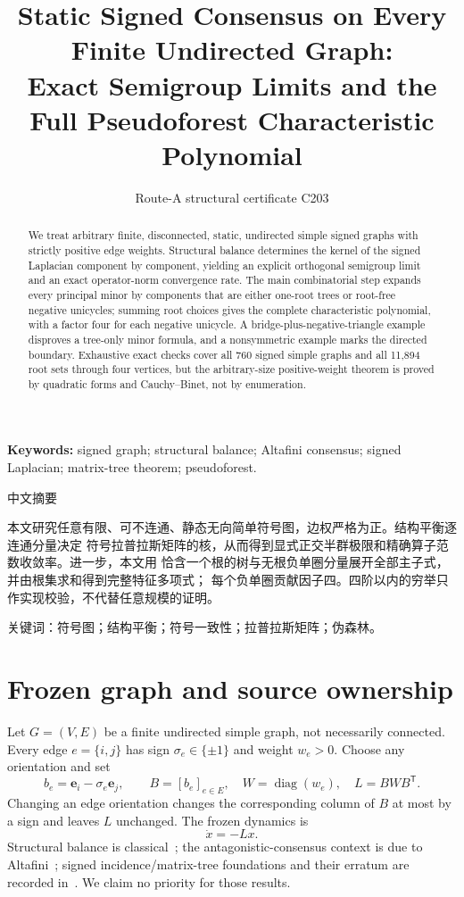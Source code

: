 \documentclass[9pt]{extarticle}
\title{Static Signed Consensus on Every Finite Undirected Graph:\\
Exact Semigroup Limits and the Full Pseudoforest Characteristic Polynomial}
\author{Route-A structural certificate C203}
\date{}
\begin{document}
\maketitle

\begin{abstract}
We treat arbitrary finite, disconnected, static, undirected simple signed
graphs with strictly positive edge weights.  Structural balance determines the
kernel of the signed Laplacian component by component, yielding an explicit
orthogonal semigroup limit and an exact operator-norm convergence rate.  The
main combinatorial step expands every principal minor by components that are
either one-root trees or root-free negative unicycles; summing root choices
gives the complete characteristic polynomial, with a factor four for each
negative unicycle.  A bridge-plus-negative-triangle example disproves a
tree-only minor formula, and a nonsymmetric example marks the directed
boundary.  Exhaustive exact checks cover all 760 signed simple graphs and all
11,894 root sets through four vertices, but the arbitrary-size positive-weight
theorem is proved by quadratic forms and Cauchy--Binet, not by enumeration.
\end{abstract}
\noindent\textbf{Keywords:} signed graph; structural balance; Altafini
consensus; signed Laplacian; matrix-tree theorem; pseudoforest.

\begin{otherlanguage}{chinese-simplified}
\begin{center}{\large 中文摘要}\end{center}
本文研究任意有限、可不连通、静态无向简单符号图，边权严格为正。结构平衡逐连通分量决定
符号拉普拉斯矩阵的核，从而得到显式正交半群极限和精确算子范数收敛率。进一步，本文用
恰含一个根的树与无根负单圈分量展开全部主子式，并由根集求和得到完整特征多项式；
每个负单圈贡献因子四。四阶以内的穷举只作实现校验，不代替任意规模的证明。

\noindent 关键词：符号图；结构平衡；符号一致性；拉普拉斯矩阵；伪森林。
\end{otherlanguage}

\section{Frozen graph and source ownership}
Let $G=(V,E)$ be a finite undirected simple graph, not necessarily connected.
Every edge $e=\{i,j\}$ has sign $\sigma_e\in\{\pm1\}$ and weight $w_e>0$.
Choose any orientation and set
\[
 b_e=\mathbf e_i-\sigma_e\mathbf e_j,\qquad
 B=[b_e]_{e\in E},\quad W=\operatorname{diag}(w_e),\quad L=BWB^{\mathsf T}.
\]
Changing an edge orientation changes the corresponding column of $B$ at most
by a sign and leaves $L$ unchanged.  The frozen dynamics is
\begin{equation}\label{eq:flow} \dot x=-Lx.\end{equation}
Structural balance is classical~\cite{Harary53}; the antagonistic-consensus
context is due to Altafini~\cite{Altafini13}; signed incidence/matrix-tree
foundations and their erratum are recorded in~\cite{Z82,Z83}.  We claim no
priority for those results.
\end{document}
